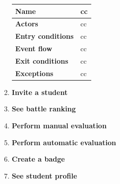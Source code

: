 \begin{enumerate}[label=\textbf{UC.\arabic*}]
        \begin{table}[H]
    	    \centering
                \renewcommand{\arraystretch}{1.5}
                \begin{tabular}{|m{3.2cm}|m{9.8cm}|}
                    \hline
                    \textbf{Name} & cc \\
                    \hline
                    \textbf{Actors} & cc \\
                    \hline
                    \textbf{Entry conditions}  & cc \\
                    \hline
                    \textbf{Event flow}  & cc \\ 
                    \hline
                    \textbf{Exit conditions}  & cc \\
                    \hline
                    \textbf{Exceptions}  & cc \\
                    \hline 
                \end{tabular}
        \end{table}
        \item {} \textbf{Invite a student}
        \item {} \textbf{See battle ranking}
        \item {} \textbf{Perform manual evaluation}
        \item {} \textbf{Perform automatic evaluation}
        \item {} \textbf{Create a badge}
        \item {} \textbf{See student profile}
    \end{enumerate}
    

